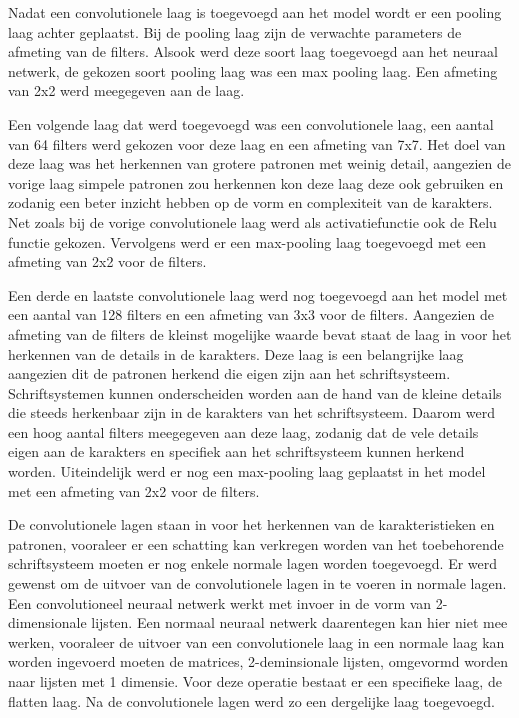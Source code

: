 Nadat een convolutionele laag is toegevoegd aan het model wordt er een pooling laag achter geplaatst.
Bij de pooling laag zijn de verwachte parameters de afmeting van de filters.
Alsook werd deze soort laag toegevoegd aan het neuraal netwerk, 
de gekozen soort pooling laag was een max pooling laag.
Een afmeting van 2x2 werd meegegeven aan de laag.

Een volgende laag dat werd toegevoegd was een convolutionele laag,
een aantal van 64 filters werd gekozen voor deze laag en een afmeting van 7x7.
Het doel van deze laag was het herkennen van grotere patronen met weinig detail, aangezien de vorige laag simpele patronen zou herkennen kon deze laag deze ook gebruiken en zodanig een beter inzicht hebben op de vorm en complexiteit van de karakters.
Net zoals bij de vorige convolutionele laag werd als activatiefunctie ook de Relu functie gekozen.
Vervolgens werd er een max-pooling laag toegevoegd met een afmeting van 2x2 voor de filters.

Een derde en laatste convolutionele laag werd nog toegevoegd aan het model met een aantal van 128 filters en een afmeting van 3x3 voor de filters.
Aangezien de afmeting van de filters de kleinst mogelijke waarde bevat staat de laag in voor het herkennen van de details in de karakters.
Deze laag is een belangrijke laag aangezien dit de patronen herkend die eigen zijn aan het schriftsysteem.
Schriftsystemen kunnen onderscheiden worden aan de hand van de kleine details die steeds herkenbaar zijn in de karakters van het schriftsysteem.
Daarom werd een hoog aantal filters meegegeven aan deze laag, zodanig dat de vele details eigen aan de karakters en specifiek aan het schriftsysteem kunnen herkend worden.
Uiteindelijk werd er nog een max-pooling laag geplaatst in het model met een afmeting van 2x2 voor de filters.

De convolutionele lagen staan in voor het herkennen van de karakteristieken en patronen, vooraleer er een schatting kan verkregen worden van het toebehorende schriftsysteem moeten er nog enkele normale lagen worden toegevoegd.
Er werd gewenst om de uitvoer van de convolutionele lagen in te voeren in normale lagen.
Een convolutioneel neuraal netwerk werkt met invoer in de vorm van 2-dimensionale lijsten.
Een normaal neuraal netwerk daarentegen kan hier niet mee werken, vooraleer de uitvoer van een convolutionele laag in een normale laag kan worden ingevoerd moeten de matrices, 2-deminsionale lijsten, omgevormd worden naar lijsten met 1 dimensie.
Voor deze operatie bestaat er een specifieke laag, de flatten laag.
Na de convolutionele lagen werd zo een dergelijke laag toegevoegd.

